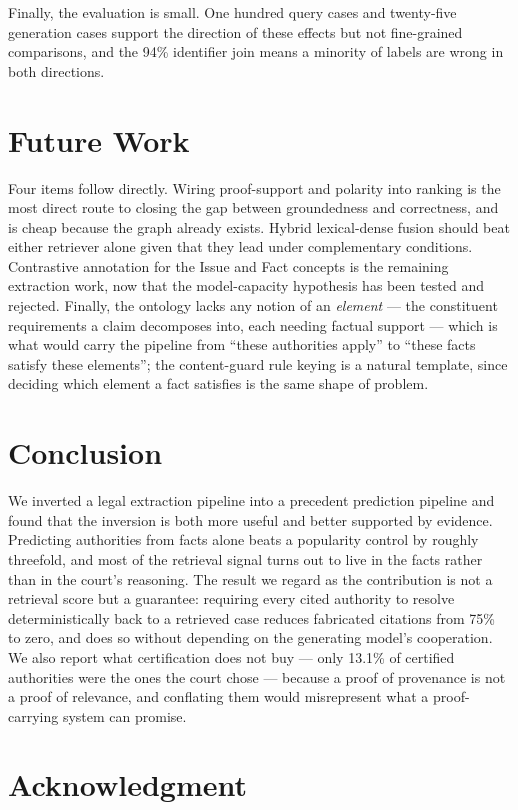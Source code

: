 \documentclass[10pt,conference]{IEEEtran}
\begin{document}
Finally, the evaluation is small. One hundred query cases and twenty-five generation cases
support the direction of these effects but not fine-grained comparisons, and the 94\%
identifier join means a minority of labels are wrong in both directions.

\section{Future Work}

Four items follow directly. Wiring proof-support and polarity into ranking is the most direct
route to closing the gap between groundedness and correctness, and is cheap because the graph
already exists. Hybrid lexical-dense fusion should beat either retriever alone given that
they lead under complementary conditions. Contrastive annotation for the Issue and Fact
concepts is the remaining extraction work, now that the model-capacity hypothesis has been
tested and rejected. Finally, the ontology lacks any notion of an \emph{element} --- the
constituent requirements a claim decomposes into, each needing factual support --- which is
what would carry the pipeline from ``these authorities apply'' to ``these facts satisfy these
elements''; the content-guard rule keying is a natural template, since deciding which element
a fact satisfies is the same shape of problem.

\section{Conclusion}

We inverted a legal extraction pipeline into a precedent prediction pipeline and found that
the inversion is both more useful and better supported by evidence. Predicting authorities
from facts alone beats a popularity control by roughly threefold, and most of the retrieval
signal turns out to live in the facts rather than in the court's reasoning. The result we
regard as the contribution is not a retrieval score but a guarantee: requiring every cited
authority to resolve deterministically back to a retrieved case reduces fabricated citations
from 75\% to zero, and does so without depending on the generating model's cooperation. We
also report what certification does not buy --- only 13.1\% of certified authorities were the
ones the court chose --- because a proof of provenance is not a proof of relevance, and
conflating them would misrepresent what a proof-carrying system can promise.

\section*{Acknowledgment}
\end{document}
